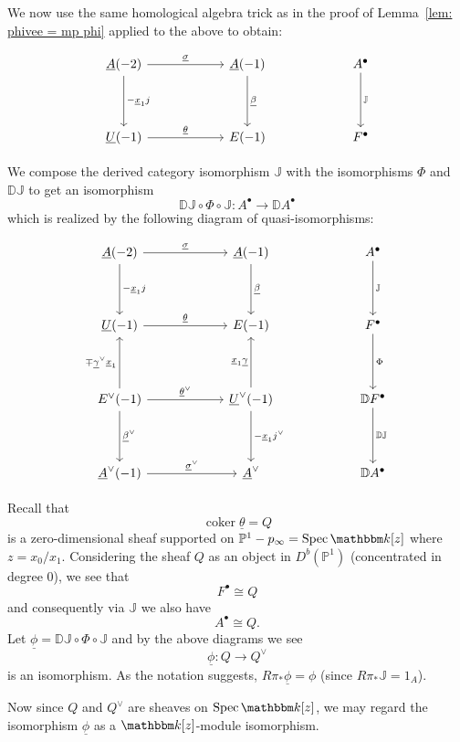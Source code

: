 \documentclass{amsart}
\theoremstyle{definition}
\newcommand{\DD} {{\mathbb D}}
\newcommand{\JJ} {{\mathbb J}}
\newcommand{\kk} {{\mathbbm k}}
\newcommand{\PP}{\mathbb{P}}
\newcommand{\coker}{\operatorname{coker}}
\newcommand{\UL}[1]{\underline{#1}}
\newcommand{\Rpistar}{R\pi_{*}}
\begin{document}
We now use the same homological algebra trick as in the proof of
Lemma~\ref{lem: phivee = mp phi} applied to the above to obtain:

\[
\begin{tikzcd}[column sep=6em,row sep=4em]
  \UL{A}(-2)
    \arrow[d,"-\UL{x}_{1}j"]
    \arrow[r,"\UL{\sigma  }"]
  & \UL{A}(-1)
    \arrow[d,"\UL{\beta }"]
  & A^{\bullet }
    \arrow[d,"\JJ "]
  \\
  \UL{U}(-1)
    \arrow[r,"\UL{\theta }"]
  & E(-1)
  & F^{\bullet}
\end{tikzcd}
\]

We compose the derived category isomorphism $\JJ$ with the
isomorphisms $\Phi$ and $\DD \JJ$ to get an isomorphism
\[
\DD \JJ \circ \Phi \circ \JJ :A^{\bullet}\longrightarrow \DD A^{\bullet }
\]
which is realized by the following diagram of quasi-isomorphisms:

\begin{equation}\label{eqn: big diagram}
\begin{tikzcd}[column sep=6em,row sep=4em]
  \UL{A}(-2)
    \arrow[d,"-\UL{x}_{1}j"]
    \arrow[r,"\UL{\sigma  }"]
  & \UL{A}(-1)
    \arrow[d,"\UL{\beta }"]
  & A^{\bullet }
    \arrow[d,"\JJ "]
  \\
  \UL{U}(-1)
    \arrow[r,"\UL{\theta }"]
  & E(-1)
  & F^{\bullet}
    \arrow[d,"\Phi"]\\
  E^{\vee}(-1)
    \arrow[d,"\UL{\beta}^{\vee}"]
    \arrow[u,"\mp \UL{\gamma}^{\vee}\UL{x}_{1}"]
    \arrow[r,"\UL{\theta }^{\vee}"]
  & \UL{U}^{\vee }(-1)
    \arrow[d,"-\UL{x}_{1}j^{\vee}"]
    \arrow[u,"\UL{x}_{1}\UL{\gamma }"]
  & \DD F^{\bullet}
    \arrow[d,"\DD \JJ "]\\
    \UL{A}^{\vee}(-1) 
    \arrow[r,"\UL{\sigma  }^{\vee}"]
  & \UL{A}^{\vee }
  & \DD A^{\bullet} 
\end{tikzcd}
\end{equation}

Recall that 
\[
\coker \UL{\theta} = Q
\]
is a zero-dimensional sheaf supported on
$\PP^{1}-p_{\infty}=\operatorname{Spec}\kk [z]$ where
$z=x_{0}/x_{1}$. Considering the sheaf $Q$ as an object in
$D^{b}(\PP^{1})$ (concentrated in degree 0), we see that 
\[
F^{\bullet}\cong Q
\]
and consequently via $\JJ$ we also have 
\[
A^{\bullet}\cong Q.
\]
Let $\UL{\phi}=\DD \JJ \circ \Phi \circ \JJ$ and by the above diagrams
we see
\[
\UL{\phi}: Q\longrightarrow Q^{\vee}
\]
is an isomorphism. As the notation suggests, $\Rpistar \UL{\phi}=\phi$
(since $\Rpistar \JJ =1_{A}$).

Now since $Q$ and $Q^{\vee}$ are sheaves on $\operatorname{Spec}\kk
[z]$, we may regard the isomorphism $\UL{\phi }$ as a $\kk [z]$-module
isomorphism.
\end{document}
